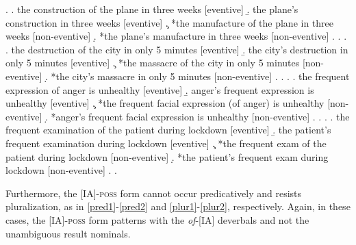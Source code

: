 \documentclass[12pt]{article}
\begin{document}
\singlespacing
\ex. \label{eventive1}
\a. the construction of the plane in three weeks \hfill [eventive]
\b. the plane's construction in three weeks \hfill [eventive]
\c. *the manufacture of the plane in three weeks \hfill [non-eventive]
\d. *the plane's manufacture in three weeks \hfill [non-eventive]
\z. \z. 
\ex. 
\a. the destruction of the city in only 5 minutes \hfill [eventive]
\b. the city's destruction in only 5 minutes \hfill [eventive]
\c. *the massacre of the city in only 5 minutes \hfill [non-eventive]
\d. *the city's massacre in only 5 minutes \hfill [non-eventive]\footnotemark
\z. \z. 
\ex.
\a. the frequent expression of anger is unhealthy \hfill [eventive]
\b. anger's frequent expression is unhealthy \hfill [eventive]
\c. *the frequent facial expression (of anger) is unhealthy \hfill [non-eventive]
\d. *anger's frequent facial expression is unhealthy \hfill [non-eventive]
\z. \z. 
\ex. \label{eventive2}
\a. the frequent examination of the patient during lockdown \hfill [eventive]
\b. the patient's frequent examination during lockdown \hfill [eventive]
\c. *the frequent exam of the patient during lockdown \hfill [non-eventive]
\d. *the patient's frequent exam during lockdown \hfill [non-eventive]
\z. \z. \par
{}
\par \par

\doublespacing

\noindent Furthermore, the [IA]-\textsc{poss} form cannot occur predicatively and resists pluralization, as in \ref{pred1}-\ref{pred2} and \ref{plur1}-\ref{plur2}, respectively. Again, in these cases, the [IA]-\textsc{poss} form patterns with the \textit{of}-[IA] deverbals and not the unambiguous result nominals.

\singlespacing
\end{document}
